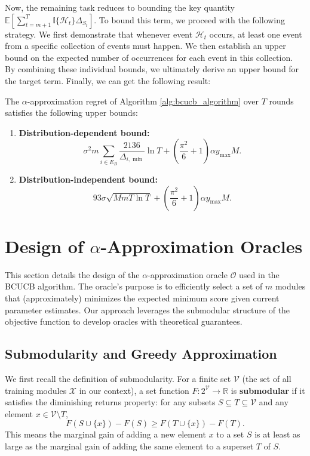 \documentclass[opre,sglanonrev]{informs4}
\begin{document}
Now, the remaining task reduces to bounding the key quantity \(\mathbb{E}\left[\sum_{t=m+1}^{T} \mathbb{I}\{\mathcal{H}_t\} \Delta_{S_t}\right]\). To bound this term, we proceed with the following strategy. We first demonstrate that whenever event \(\mathcal{H}_t\) occurs, at least one event from a specific collection of events must happen. We then establish an upper bound on the expected number of occurrences for each event in this collection. By combining these individual bounds, we ultimately derive an upper bound for the target term. Finally, we can get the following result:

\begin{theorem}
\label{thm:regret_bound}
The $\alpha$-approximation regret of Algorithm \ref{alg:bcucb_algorithm} over $T$ rounds satisfies the following upper bounds:
\begin{enumerate}
    \item \textbf{Distribution-dependent bound:}
    $$
    \sigma^2 m \sum_{i \in E_B} \frac{2136}{\Delta_{i,\min}} \ln T + \left(\frac{\pi^2}{6} + 1\right) \alpha y_{\text{max}} M.
    $$
    
    \item \textbf{Distribution-independent bound:}
    $$
    93\sigma \sqrt{M m T \ln T} + \left(\frac{\pi^2}{6} + 1\right) \alpha y_{\text{max}} M.
    $$
\end{enumerate}
\end{theorem}


\section{Design of $\alpha$-Approximation Oracles}
\label{oracle}

This section details the design of the $\alpha$-approximation oracle $\mathcal{O}$ used in the BCUCB algorithm. The oracle's purpose is to efficiently select a set of $m$ modules that (approximately) minimizes the expected minimum score given current parameter estimates. Our approach leverages the submodular structure of the objective function to develop oracles with theoretical guarantees.

\subsection{Submodularity and Greedy Approximation}

We first recall the definition of submodularity. For a finite set $\mathcal{V}$ (the set of all training modules $\mathcal{X}$ in our context), a set function $F: 2^{\mathcal{V}} \to \mathbb{R}$ is \textbf{submodular} if it satisfies the diminishing returns property: for any subsets $S \subseteq T \subseteq \mathcal{V}$ and any element $x \in \mathcal{V} \setminus T$,
$$
F(S \cup \{x\}) - F(S) \geq F(T \cup \{x\}) - F(T).
$$
This means the marginal gain of adding a new element $x$ to a set $S$ is at least as large as the marginal gain of adding the same element to a superset $T$ of $S$.
\end{document}
